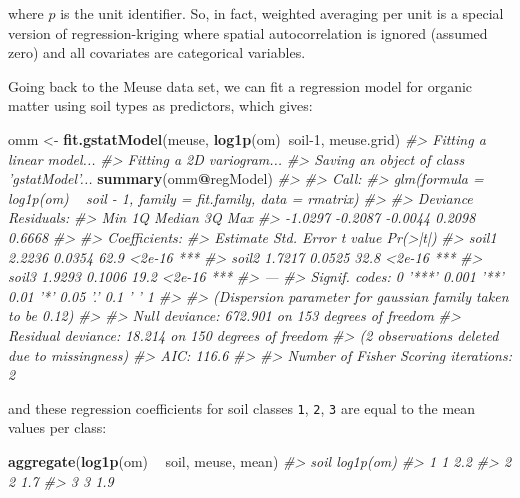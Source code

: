 \documentclass[graybox,natbib,nospthms,UStrade]{svmono}
\newenvironment{Shaded}{\begin{snugshade}}{\end{snugshade}}
\newcommand{\CommentTok}[1]{\textcolor[rgb]{0.37,0.37,0.37}{\textit{#1}}}
\newcommand{\DecValTok}[1]{\textcolor[rgb]{0.06,0.06,0.06}{#1}}
\newcommand{\KeywordTok}[1]{\textcolor[rgb]{0.27,0.27,0.27}{\textbf{#1}}}
\newcommand{\NormalTok}[1]{#1}
\newcommand{\OperatorTok}[1]{\textcolor[rgb]{0.43,0.43,0.43}{\textbf{#1}}}
\newcommand{\StringTok}[1]{\textcolor[rgb]{0.5,0.5,0.5}{#1}}
\begin{document}
where \(p\) is the unit identifier. So, in fact, weighted averaging per
unit is a special version of regression-kriging where spatial
autocorrelation is ignored (assumed zero) and all covariates are
categorical variables.

Going back to the Meuse data set, we can fit a regression model for
organic matter using soil types as predictors, which gives:

\begin{Shaded}
\begin{Highlighting}[]
\NormalTok{omm <-}\StringTok{ }\KeywordTok{fit.gstatModel}\NormalTok{(meuse, }\KeywordTok{log1p}\NormalTok{(om)}\OperatorTok{~}\NormalTok{soil}\DecValTok{-1}\NormalTok{, meuse.grid)}
\CommentTok{#> Fitting a linear model...}
\CommentTok{#> Fitting a 2D variogram...}
\CommentTok{#> Saving an object of class 'gstatModel'...}
\KeywordTok{summary}\NormalTok{(omm}\OperatorTok{@}\NormalTok{regModel)}
\CommentTok{#> }
\CommentTok{#> Call:}
\CommentTok{#> glm(formula = log1p(om) ~ soil - 1, family = fit.family, data = rmatrix)}
\CommentTok{#> }
\CommentTok{#> Deviance Residuals: }
\CommentTok{#>     Min       1Q   Median       3Q      Max  }
\CommentTok{#> -1.0297  -0.2087  -0.0044   0.2098   0.6668  }
\CommentTok{#> }
\CommentTok{#> Coefficients:}
\CommentTok{#>       Estimate Std. Error t value Pr(>|t|)    }
\CommentTok{#> soil1   2.2236     0.0354    62.9   <2e-16 ***}
\CommentTok{#> soil2   1.7217     0.0525    32.8   <2e-16 ***}
\CommentTok{#> soil3   1.9293     0.1006    19.2   <2e-16 ***}
\CommentTok{#> ---}
\CommentTok{#> Signif. codes:  0 '***' 0.001 '**' 0.01 '*' 0.05 '.' 0.1 ' ' 1}
\CommentTok{#> }
\CommentTok{#> (Dispersion parameter for gaussian family taken to be 0.12)}
\CommentTok{#> }
\CommentTok{#>     Null deviance: 672.901  on 153  degrees of freedom}
\CommentTok{#> Residual deviance:  18.214  on 150  degrees of freedom}
\CommentTok{#>   (2 observations deleted due to missingness)}
\CommentTok{#> AIC: 116.6}
\CommentTok{#> }
\CommentTok{#> Number of Fisher Scoring iterations: 2}
\end{Highlighting}
\end{Shaded}

and these regression coefficients for soil classes \texttt{1}, \texttt{2}, \texttt{3} are
equal to the mean values per class:

\begin{Shaded}
\begin{Highlighting}[]
\KeywordTok{aggregate}\NormalTok{(}\KeywordTok{log1p}\NormalTok{(om) }\OperatorTok{~}\StringTok{ }\NormalTok{soil, meuse, mean) }
\CommentTok{#>   soil log1p(om)}
\CommentTok{#> 1    1       2.2}
\CommentTok{#> 2    2       1.7}
\CommentTok{#> 3    3       1.9}
\end{Highlighting}
\end{Shaded}
\end{document}
